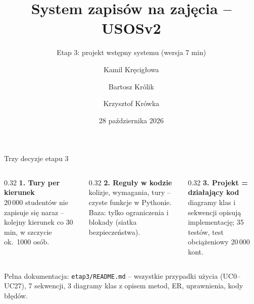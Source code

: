 \documentclass[aspectratio=169,11pt]{beamer}
\title{System zapisów na zajęcia -- USOSv2}
\subtitle{Etap 3: projekt wstępny systemu (wersja 7 min)}
\author{Kamil Kręcigłowa \and Bartosz Królik \and Krzysztof Krówka}
\institute{Inżynieria Oprogramowania, zima 2026/2027}
\date{28 października 2026}
\begin{document}
\maketitle

\begin{frame}{Trzy decyzje etapu 3}
  \begin{columns}[T]
    \begin{column}{0.32\textwidth}
      \textbf{1. Tury per kierunek}\\[2pt]
      \small 20\,000 studentów nie zapisuje się naraz -- kolejny kierunek co 30 min, w szczycie ok.\ 1000 osób.
    \end{column}
    \begin{column}{0.32\textwidth}
      \textbf{2. Reguły w kodzie}\\[2pt]
      \small kolizje, wymagania, tury -- czyste funkcje w Pythonie. Baza: tylko ograniczenia i blokady (siatka bezpieczeństwa).
    \end{column}
    \begin{column}{0.32\textwidth}
      \textbf{3. Projekt = działający kod}\\[2pt]
      \small diagramy klas i sekwencji opisują implementację; 35 testów, test obciążeniowy 20\,000 kont.
    \end{column}
  \end{columns}
  \vspace{10pt}
  \footnotesize Pełna dokumentacja: \texttt{etap3/README.md} -- wszystkie przypadki użycia (UC0--UC27), 7 sekwencji, 3 diagramy klas z opisem metod, ER, uprawnienia, kody błędów.
\end{frame}
\end{document}
